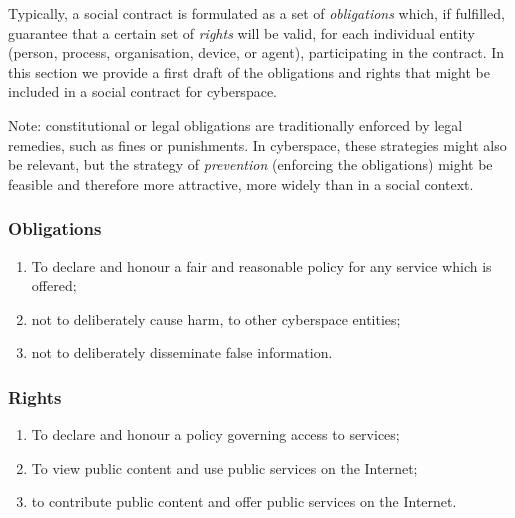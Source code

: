 Typically, a social contract is formulated as a set of {\em obligations} which,
if fulfilled, guarantee that a certain set of {\em rights} will be valid, for 
each individual entity (person, process, organisation, device, or agent), participating
in the contract. In this section we provide a first draft of the obligations
and rights that might be included in a social contract for cyberspace.

Note: constitutional or legal obligations are traditionally enforced by 
legal remedies, such as fines or punishments. In cyberspace, these strategies
might also be relevant, but the strategy of {\em prevention} (enforcing the obligations)
might be feasible and therefore more attractive, more widely than in a social
context.

\subsubsection*{Obligations}

\begin{enumerate}[O-1.]

\item\label{honorpolicy} To declare and honour a fair and reasonable
policy for any service which is offered;

\item\label{noharm} not to deliberately cause harm, to other cyberspace entities;

\item\label{nodisinf} not to deliberately disseminate false information.

\end{enumerate}

\subsubsection*{Rights}

\begin{enumerate}[R-1.]

\item\label{accesspolicy} To declare and honour a policy governing access to services;

\item\label{viewpublic} To view public content and use public services on the Internet;

\item\label{offerpublic} to contribute public content and offer public services on the Internet.


\end{enumerate}


